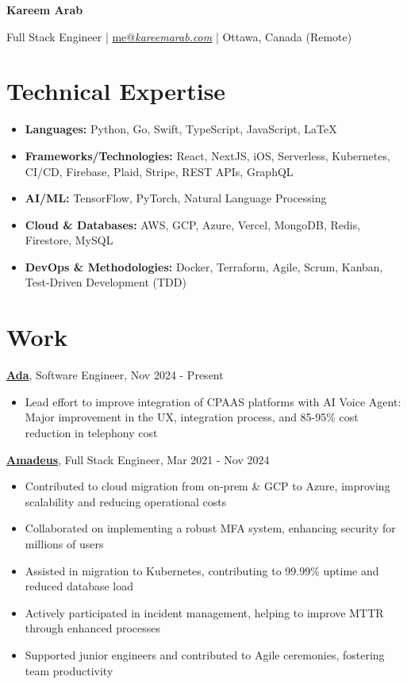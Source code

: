\documentclass[9pt]{article}
\begin{document}
\begin{center}
    {\LARGE \textbf{Kareem Arab}}\par\smallskip
    Full Stack Engineer | \href{mailto:me@kareemarab.com}{me@\textit{kareemarab.com}} | Ottawa, Canada (Remote)
\end{center}

\section*{Technical Expertise}
\begin{itemize}
    \setlength\itemsep{0em}
    \item \textbf{Languages:} Python, Go, Swift, TypeScript, JavaScript, \LaTeX
    \item \textbf{Frameworks/Technologies:} React, NextJS, iOS, Serverless, Kubernetes, CI/CD, Firebase, Plaid, Stripe, REST APIs, GraphQL
    \item \textbf{AI/ML:} TensorFlow, PyTorch, Natural Language Processing
    \item \textbf{Cloud \& Databases:} AWS, GCP, Azure, Vercel, MongoDB, Redis, Firestore, MySQL
    \item \textbf{DevOps \& Methodologies:} Docker, Terraform, Agile, Scrum, Kanban, Test-Driven Development (TDD)
\end{itemize}

\section*{Work}

\noindent
\textbf{\href{https://ada.cx}{Ada}}, Software Engineer, Nov 2024 - Present
\begin{itemize}
    \setlength\itemsep{0em}
    \item Lead effort to improve integration of CPAAS platforms with AI Voice Agent: Major improvement in the UX, integration process, and 85-95\% cost reduction in telephony cost
\end{itemize}

\noindent
\textbf{\href{https://amadeus.com/en}{Amadeus}}, Full Stack Engineer, Mar 2021 - Nov 2024
\begin{itemize}
    \setlength\itemsep{0em}
    \item Contributed to cloud migration from on-prem \& GCP to Azure, improving scalability and reducing operational costs
    \item Collaborated on implementing a robust MFA system, enhancing security for millions of users
    \item Assisted in migration to Kubernetes, contributing to 99.99\% uptime and reduced database load
    \item Actively participated in incident management, helping to improve MTTR through enhanced processes
    \item Supported junior engineers and contributed to Agile ceremonies, fostering team productivity
\end{itemize}
\end{document}
